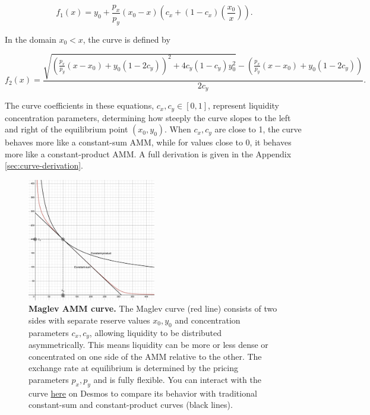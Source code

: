 \documentclass{article}
\begin{document}
\begin{equation}
    \label{eq:fx1-main}
    f_1(x) 
    =
    y_{0}+\frac{p_{x}}{p_{y}}\left(x_{0}-x\right)\left(c_{x}+\left(1-c_{x}\right)\left(\frac{x_{0}}{x}\right)\right).
\end{equation}

In the domain $x_0 < x$, the curve is defined by

\begin{equation}
    \label{eq:fx2-main}
    f_2(x) 
    =
    \frac{
        \sqrt{
            \left( \frac{p_x}{p_y} (x - x_0) + y_0 (1 - 2c_y) \right)^2 
            + 4c_y (1 - c_y) y_0^2
        } 
        - \left( \frac{p_x}{p_y} (x - x_0) + y_0 (1 - 2c_y) \right)
    }{2c_y}.
\end{equation}

 The curve coefficients in these equations, \( c_x, c_y \in [0, 1] \), represent liquidity concentration parameters, determining how steeply the curve slopes to the left and right of the equilibrium point $(x_0, y_0)$. When \( c_x, c_y \) are close to 1, the curve behaves more like a constant-sum AMM, while for values close to 0, it behaves more like a constant-product AMM. A full derivation is given in the Appendix \ref{sec:curve-derivation}.  
 
 \begin{figure}[h]  %
    \centering  %
    \includegraphics[width=0.5\textwidth]{curve.png} %
    \caption{\textbf{Maglev AMM curve.} The Maglev curve (red line) consists of two sides with separate reserve values $x_0, y_0$ and concentration parameters $c_x, c_y$, allowing liquidity to be distributed asymmetrically. This means liquidity can be more or less dense or concentrated on one side of the AMM relative to the other. The exchange rate at equilibrium is determined by the pricing parameters $p_x, p_y$ and is fully flexible. You can interact with the curve \href{https://www.desmos.com/calculator/gzwmvbs1dk}{here} on Desmos to compare its behavior with traditional constant-sum and constant-product curves (black lines).}
    \label{fig:fig1}  %
\end{figure}
\end{document}
